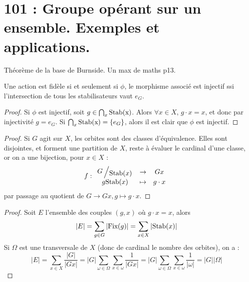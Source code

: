 \twocolumn  %


\section{101 : Groupe opérant sur un ensemble. Exemples et applications.}


\begin{developpements}
	\item Théorème de la base de Burnside. Un max de maths p13.
\end{developpements}
 

\Prop
{
	Une action est fidèle si et seulement si $\phi$, le morphisme associé est injectif ssi l'intersection de tous les stabilisateurs vaut $e_G$.
}


\begin{proof}
	Si $\phi$ est injectif, soit $g\in  \bigcap_x \textup{Stab(x)}$. Alors $\forall x \in X$, $g\cdot x = x$, et donc par injectivité $g = e_G$. Si $\bigcap_x \textup{Stab(x)} = \{e_G\}$, alors il est clair que $\phi$ est injectif.
\end{proof}



\begin{proof}
	Si $G$ agit sur $X$, les orbites sont des classes d'équivalence. Elles sont disjointes, et forment une partition de $X$, reste à évaluer le cardinal d'une classe, or on a une bijection, pour $x \in X$ :
	\[
		f : \begin{array}{cccc} \bigslant{G}{\textup{Stab}(x)} & \to & G x\\ g \textup{Stab}(x) & \mapsto & g\cdot x\end{array}
	\]
	par passage au quotient de $G \to Gx,g \mapsto g \cdot x$.
\end{proof}



\begin{proof}
	Soit $E$ l'ensemble des couples $(g,x)$ où $g\cdot x = x$, alors
	\[
		\vert E \vert = \sum_{g \in G}\vert \textup{Fix}(g)\vert = \sum_{x\in X} \vert \textup{Stab}(x) \vert
	\]
	Si $\Omega$ est une transversale de $X$ (donc de cardinal le nombre des orbites), on a :
	\[ 
		\vert E \vert = \sum_{x \in X} \frac{\vert G\vert}{\vert Gx\vert } = \vert G \vert \sum_{ \omega \in \Omega}  \sum_{ x \in \omega} 	\frac{1}{\vert Gx\vert} = \vert G \vert \sum_{ \omega \in \Omega}  \sum_{ x \in \omega} \frac{1}{\vert \omega\vert}  = \vert G  \vert \vert \Omega \vert 
	\]
\end{proof}


